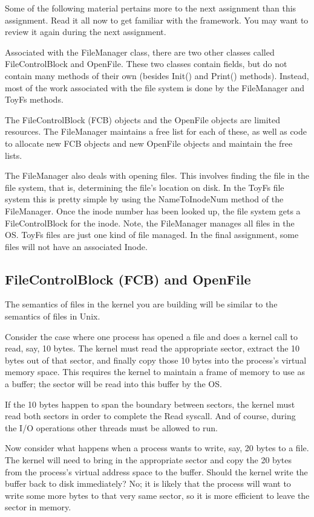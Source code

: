 \documentclass[12pt]{article}
\begin{document}
Some of the following material pertains more to the next assignment
than this assignment.  Read it all now to get familiar with the
framework.  You may want to review it again during the next
assignment.

Associated with the FileManager class, there are two other classes
called FileControlBlock and OpenFile.  These two classes contain
fields, but do not contain many methods of their own (besides Init()
and Print() methods).  Instead, most of the work associated with the
file system is done by the FileManager and ToyFs methods.

The FileControlBlock (FCB) objects and the OpenFile objects are
limited resources.  The FileManager maintains a free list for each of
these, as well as code to allocate new FCB objects and new OpenFile
objects and maintain the free lists.

The FileManager also deals with opening files.  This involves finding
the file in the file system, that is, determining the file's location
on disk.  In the ToyFs file system this is pretty simple by using the
NameToInodeNum method of the FileManager.  Once the inode number has
been looked up, the file system gets a FileControlBlock for the inode.
Note, the FileManager manages all files in the OS.  ToyFs files are
just one kind of file managed.  In the final assignment, some files
will not have an associated Inode.

\subsection{FileControlBlock (FCB) and OpenFile}

The semantics of files in the kernel you are building will be similar
to the semantics of files in Unix.

Consider the case where one process has opened a file and does a
kernel call to read, say, 10 bytes.  The kernel must read the
appropriate sector, extract the 10 bytes out of that sector, and
finally copy those 10 bytes into the process's virtual memory space.
This requires the kernel to maintain a frame of memory to use as a
buffer; the sector will be read into this buffer by the OS.

If the 10 bytes happen to span the boundary between sectors, the
kernel must read both sectors in order to complete the Read syscall.
And of course, during the I/O operations other threads must be allowed
to run.

Now consider what happens when a process wants to write, say, 20 bytes
to a file.  The kernel will need to bring in the appropriate sector
and copy the 20 bytes from the process's virtual address space to the
buffer.  Should the kernel write the buffer back to disk immediately?
No; it is likely that the process will want to write some more bytes
to that very same sector, so it is more efficient to leave the sector
in memory.
\end{document}
